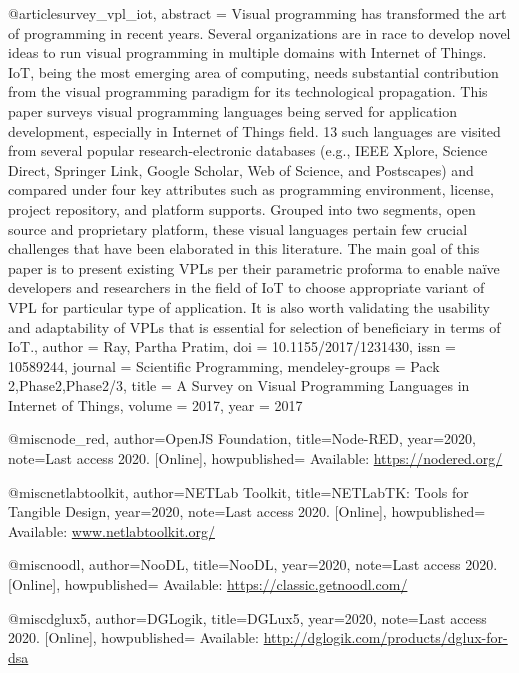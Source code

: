 @article{survey_vpl_iot,
    abstract = {Visual programming has transformed the art of programming in recent years. Several organizations are in race to develop novel ideas to run visual programming in multiple domains with Internet of Things. IoT, being the most emerging area of computing, needs substantial contribution from the visual programming paradigm for its technological propagation. This paper surveys visual programming languages being served for application development, especially in Internet of Things field. 13 such languages are visited from several popular research-electronic databases (e.g., IEEE Xplore, Science Direct, Springer Link, Google Scholar, Web of Science, and Postscapes) and compared under four key attributes such as programming environment, license, project repository, and platform supports. Grouped into two segments, open source and proprietary platform, these visual languages pertain few crucial challenges that have been elaborated in this literature. The main goal of this paper is to present existing VPLs per their parametric proforma to enable na{\"{i}}ve developers and researchers in the field of IoT to choose appropriate variant of VPL for particular type of application. It is also worth validating the usability and adaptability of VPLs that is essential for selection of beneficiary in terms of IoT.},
    author = {Ray, Partha Pratim},
    doi = {10.1155/2017/1231430},
    issn = {10589244},
    journal = {Scientific Programming},
    mendeley-groups = {Pack 2,Phase2,Phase2/3},
    title = {{A Survey on Visual Programming Languages in Internet of Things}},
    volume = {2017},
    year = {2017}
}



@misc{node_red,
    author={OpenJS Foundation},
    title={{Node-RED}},
    year={2020},
    note={Last access 2020. [Online]},
    howpublished= {Available: \url{https://nodered.org/}}
}

@misc{netlabtoolkit,
    author={NETLab Toolkit},
    title={{NETLabTK: Tools for Tangible Design}},
    year={2020},
    note={Last access 2020. [Online]},
    howpublished= {Available: \url{www.netlabtoolkit.org/}}
}

@misc{noodl,
    author={NooDL},
    title={{NooDL}},
    year={2020},
    note={Last access 2020. [Online]},
    howpublished= {Available: \url{https://classic.getnoodl.com/}}
}

@misc{dglux5,
    author={DGLogik},
    title={{DGLux5}},
    year={2020},
    note={Last access 2020. [Online]},
    howpublished= {Available: \url{http://dglogik.com/products/dglux-for-dsa}}
}

